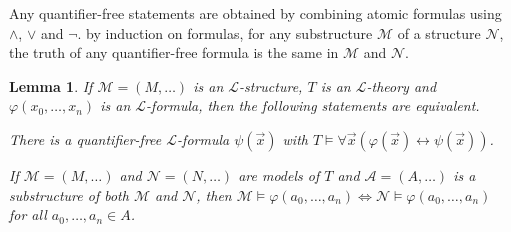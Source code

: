 \documentclass[a4paper, 11pt]{amsart}
\newtheorem{lemma}[lemma]{Lemma}
\theoremstyle{remark}
\newcommand{\cA}{\mathcal A}
\newcommand{\cL}{\mathcal L}
\newcommand{\cM}{\mathcal M}
\newcommand{\cN}{\mathcal N}
\newenvironment{enumerate-(a)}{\begin{enumerate}[label={\upshape (\alph*)}, leftmargin=2pc]}{\end{enumerate}}
\begin{document}
Any quantifier-free statements are obtained by combining atomic formulas using $\wedge$, $\vee$ and $\neg$. 
by induction on formulas, for any substructure $\cM$ of a structure $\cN$, the truth of any quantifier-free formula is the same in $\cM$ and $\cN$. 

\begin{lemma} \label{criterion for quantifier elimination} 
If $\cM=(M,\dots)$ is an $\cL$-structure, $T$ is an $\cL$-theory and $\varphi(x_0,\dots,x_n)$ is an $\cL$-formula, then the following statements are equivalent. 
\begin{enumerate-(a)} 
\item 
There is a quantifier-free $\cL$-formula $\psi(\vec{x})$ with $T\models \forall \vec{x}(\varphi(\vec{x})\leftrightarrow\psi(\vec{x}))$. 
\item \label{condition for quantifier elimination} 
If $\cM=(M,\dots)$ and $\cN=(N,\dots)$ are models of $T$ and $\cA=(A,\dots)$ is a substructure of both $\cM$ and $\cN$, then $\cM\models\varphi(a_0,\dots,a_n)\Leftrightarrow\cN\models \varphi(a_0,\dots,a_n)$ for all $a_0,\dots,a_n\in A$. 
\end{enumerate-(a)} 
\end{lemma} 
\end{document}
